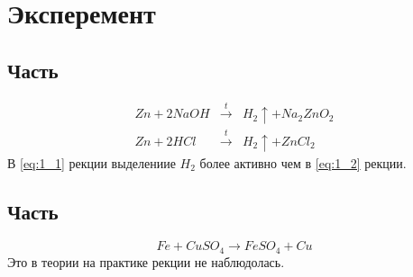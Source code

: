 \section{Эксперемент}

\subsection{Часть}

\begin{eqnarray} 
  Zn + 2NaOH &\xrightarrow{t}& H_2\uparrow + Na_2ZnO_2 
  \label{eq:1_1}\\
  Zn + 2HCl &\xrightarrow{t}& H_2\uparrow + ZnCl_2 
  \label{eq:1_2}
\end{eqnarray} 
В \ref{eq:1_1}{ рекции} выделениие $H_2$ более активно чем в
\ref{eq:1_2}{ рекции}.

\subsection{Часть}

\begin{equation} 
 Fe + CuSO_4 \xrightarrow{} FeSO_4 + Cu
\end{equation} 
Это в теории на практике рекции не наблюдолась.


